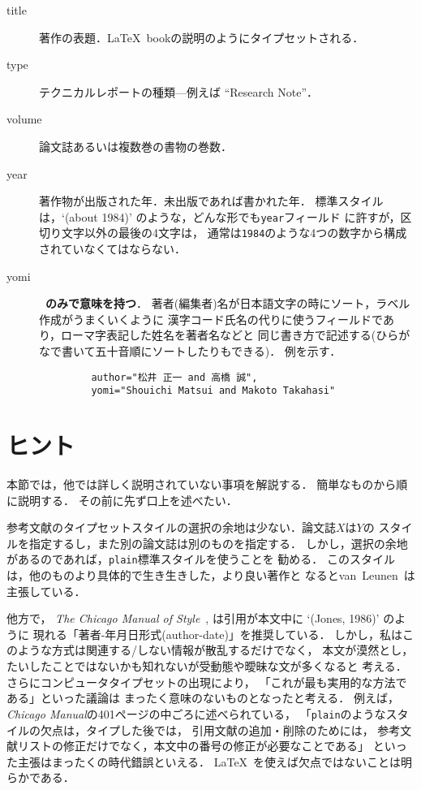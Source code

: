 \begin{description}
\item[title\hfill]
著作の表題．\LaTeX\ bookの説明のようにタイプセットされる．

\item[type\hfill]
テクニカルレポートの種類---例えば ``Research Note''．

\item[volume\hfill]
論文誌あるいは複数巻の書物の巻数．

\item[year\hfill]
著作物が出版された年．未出版であれば書かれた年．
標準スタイルは，`{(about 1984)}' のような，どんな形でも{\tt year}フィールド
に許すが，区切り文字以外の最後の4文字は，
通常は{\tt 1984}のような4つの数字から構成されていなくてはならない．

\item[yomi\hfill]{\dg\bf\JBibTeX\ のみで意味を持つ}．
著者(編集者)名が日本語文字の時にソート，ラベル作成がうまくいくように
漢字コード氏名の代りに使うフィールドであり，ローマ字表記した姓名を著者名などと
同じ書き方で記述する(ひらがなで書いて五十音順にソートしたりもできる)．
例を示す．
\begin{verbatim}
         author="松井 正一 and 高橋 誠",
         yomi="Shouichi Matsui and Makoto Takahasi"
\end{verbatim}
\end{description}
\newpage

\section{ヒント}
\label{odds-and-ends}

本節では，他では詳しく説明されていない事項を解説する．
簡単なものから順に説明する．
その前に先ず口上を述べたい．

参考文献のタイプセットスタイルの選択の余地は少ない．論文誌$X$は$Y$の
スタイルを指定するし，また別の論文誌は別のものを指定する．
しかし，選択の余地があるのであれば，{\tt plain}標準スタイルを使うことを
勧める．
このスタイルは，他のものより具体的で生き生きした，より良い著作と
なるとvan~Leunen~\cite{van-leunen}は主張している．

他方で，
{\em The Chicago Manual of Style\/}~\cite{chicago},
は引用が本文中に `(Jones, 1986)' のように
現れる「著者-年月日形式(author-date)」を推奨している．
しかし，私はこのような方式は関連する/しない情報が散乱するだけでなく，
本文が漠然とし，たいしたことではないかも知れないが受動態や曖昧な文が多くなると
考える．さらにコンピュータタイプセットの出現により，
「これが最も実用的な方法である」といった議論は
まったく意味のないものとなったと考える．
例えば，{\em Chicago Manual\/}の401ページの中ごろに述べられている，
「{\tt plain}のようなスタイルの欠点は，タイプした後では，
引用文献の追加・削除のためには，
参考文献リストの修正だけでなく，本文中の番号の修正が必要なことである」
といった主張はまったくの時代錯誤といえる．
\LaTeX\ を使えば欠点ではないことは明らかである．

